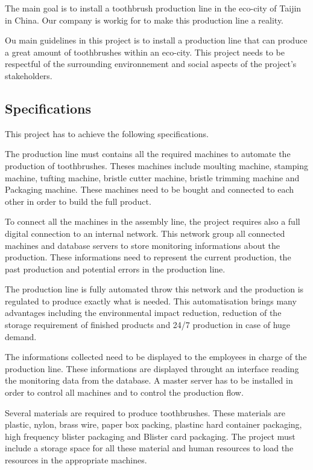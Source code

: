 The main goal is to install a toothbrush production line in the eco-city of Taijin in China.
Our company is workig for \moldco to make this production line a reality.

Ou main guidelines in this project is to install a production line that can produce a great amount of toothbrushes within an eco-city.
This project needs to be respectful of the surrounding environnement and social aspects of the project's stakeholders.

\subsection{Specifications}

This project has to achieve the following specifications.

The production line must contains all the required machines to automate the production of toothbrushes.
Theses machines include moulting machine, stamping machine, tufting machine, bristle cutter machine, bristle trimming machine and Packaging machine.
These machines need to be bought and connected to each other in order to build the full product.

To connect all the machines in the assembly line, the project requires also a full digital connection to an internal network.
This network group all connected machines and database servers to store monitoring informations about the production.
These informations need to represent the current production, the past production and potential errors in the production line.

The production line is fully automated throw this network and the production is regulated to produce exactly what is needed.
This automatisation brings many advantages including the environmental impact reduction, reduction of the storage requirement of finished products and 24/7 production in case of huge demand.

The informations collected need to be displayed to the employees in charge of the production line.
These informations are displayed throught an interface reading the monitoring data from the database.
A master server has to be installed in order to control all machines and to control the production flow.

Several materials are required to produce toothbrushes.
These materials are plastic, nylon, brass wire, paper box packing, plastinc hard container packaging, high frequency blister packaging and Blister card packaging.
The project must include a storage space for all these material and human resources to load the resources in the appropriate machines.

